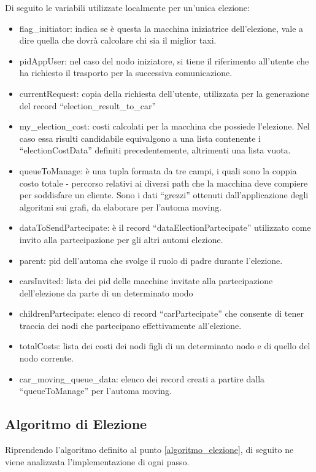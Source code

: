 Di seguito le variabili utilizzate localmente per un'unica elezione:
\begin{itemize}
	\item flag\_initiator: indica se è questa la macchina iniziatrice dell'elezione, vale a dire quella che dovrà calcolare chi sia il miglior taxi.
	\item pidAppUser: nel caso del nodo iniziatore, si tiene il riferimento all'utente che ha richiesto il trasporto per la successiva comunicazione.
	\item currentRequest: copia della richiesta dell'utente, utilizzata per la generazione del record ``election\_result\_to\_car''
	\item my\_election\_cost: costi calcolati per la macchina che possiede l'elezione. Nel caso essa risulti candidabile equivalgono a una lista contenente i ``electionCostData'' definiti precedentemente, altrimenti una lista vuota.
	\item queueToManage: è una tupla formata da tre campi, i quali sono la coppia costo totale - percorso relativi ai diversi path che la macchina deve compiere per soddisfare un cliente. Sono i dati ``grezzi'' ottenuti dall'applicazione degli algoritmi sui grafi, da elaborare per l'automa moving.
	\item dataToSendPartecipate: è il record ``dataElectionPartecipate'' utilizzato come invito alla partecipazione per gli altri automi elezione.
	\item parent: pid dell'automa che svolge il ruolo di padre durante l'elezione. 
	\item carsInvited: lista dei pid delle macchine invitate alla partecipazione dell'elezione da parte di un determinato modo
	\item childrenPartecipate: elenco di record ``carPartecipate'' che consente di tener traccia dei nodi che partecipano effettivamente all'elezione.
	\item totalCosts: lista dei costi dei nodi figli di un determinato nodo e di quello del nodo corrente.
	\item car\_moving\_queue\_data: elenco dei record creati a partire dalla ``queueToManage'' per l'automa moving.
\end{itemize}

\subsection{Algoritmo di Elezione}\label{implementazione_algoritmo_elezione}
Riprendendo l'algoritmo definito al punto \ref{algoritmo_elezione}, di seguito ne viene analizzata l'implementazione di ogni passo.

